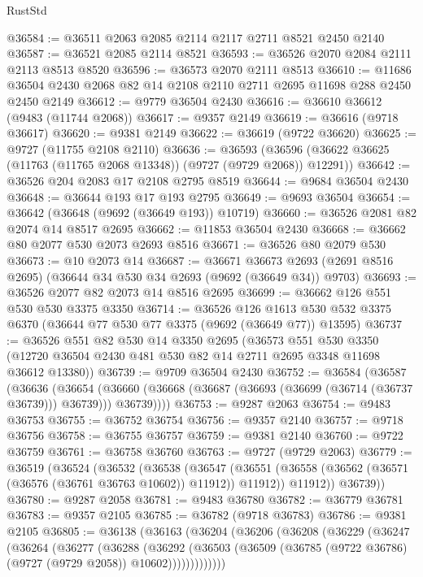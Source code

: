 \begin{lexlean}{RustStd}
\begin{coremodule}
{\begin{coremodule}
{{{{{{{{{{{{{{{{{{{{{{{{{{{{{{{{{{{{{{{{{{{{{{{{{{{{{{{@36584 := @36511 @2063 @2085 @2114 @2117 @2711 @8521 @2450 @2140
@36587 := @36521 @2085 @2114 @8521
@36593 := @36526 @2070 @2084 @2111 @2113 @8513 @8520
@36596 := @36573 @2070 @2111 @8513
@36610 := @11686 @36504 @2430 @2068 @82 @14 @2108 @2110 @2711 @2695 @11698 @288 @2450 @2450 @2149
@36612 := @9779 @36504 @2430
@36616 := @36610 @36612 (@9483 (@11744 @2068))
@36617 := @9357 @2149
@36619 := @36616 (@9718 @36617)
@36620 := @9381 @2149
@36622 := @36619 (@9722 @36620)
@36625 := @9727 (@11755 @2108 @2110)
@36636 := @36593
    (@36596 (@36622 @36625 (@11763 (@11765 @2068 @13348)) (@9727 (@9729 @2068)) @12291))
@36642 := @36526 @204 @2083 @17 @2108 @2795 @8519
@36644 := @9684 @36504 @2430
@36648 := @36644 @193 @17 @193 @2795
@36649 := @9693 @36504
@36654 := @36642 (@36648 (@9692 (@36649 @193)) @10719)
@36660 := @36526 @2081 @82 @2074 @14 @8517 @2695
@36662 := @11853 @36504 @2430
@36668 := @36662 @80 @2077 @530 @2073 @2693 @8516
@36671 := @36526 @80 @2079 @530
@36673 := @10 @2073 @14
@36687 := @36671
    @36673
    @2693
    (@2691 @8516 @2695)
    (@36644 @34 @530 @34 @2693 (@9692 (@36649 @34)) @9703)
@36693 := @36526 @2077 @82 @2073 @14 @8516 @2695
@36699 := @36662 @126 @551 @530 @530 @3375 @3350
@36714 := @36526
    @126
    @1613
    @530
    @532
    @3375
    @6370
    (@36644 @77 @530 @77 @3375 (@9692 (@36649 @77)) @13595)
@36737 := @36526
    @551
    @82
    @530
    @14
    @3350
    @2695
    (@36573
      @551
      @530
      @3350
      (@12720 @36504 @2430 @481 @530 @82 @14 @2711 @2695 @3348 @11698 @36612 @13380))
@36739 := @9709 @36504 @2430
@36752 := @36584
    (@36587
      (@36636
        (@36654
          (@36660 (@36668 (@36687 (@36693 (@36699 (@36714 (@36737 @36739))) @36739))) @36739))))
@36753 := @9287 @2063
@36754 := @9483 @36753
@36755 := @36752 @36754
@36756 := @9357 @2140
@36757 := @9718 @36756
@36758 := @36755 @36757
@36759 := @9381 @2140
@36760 := @9722 @36759
@36761 := @36758 @36760
@36763 := @9727 (@9729 @2063)
@36779 := @36519
    (@36524
      (@36532
        (@36538
          (@36547
            (@36551 (@36558 (@36562 (@36571 (@36576 (@36761 @36763 @10602)) @11912)) @11912))
            @11912))
        @36739))
@36780 := @9287 @2058
@36781 := @9483 @36780
@36782 := @36779 @36781
@36783 := @9357 @2105
@36785 := @36782 (@9718 @36783)
@36786 := @9381 @2105
@36805 := @36138
    (@36163
      (@36204
        (@36206
          (@36208
            (@36229
              (@36247
                (@36264
                  (@36277
                    (@36288
                      (@36292
                        (@36503
                          (@36509 (@36785 (@9722 @36786) (@9727 (@9729 @2058)) @10602)))))))))))))
}}}}}}}}}}}}}}}}}}}}}}}}}}}}}}}}}}}}}}}}}}}}}}}}}}}}}}}
\end{coremodule}}
\end{coremodule}
\end{lexlean}
